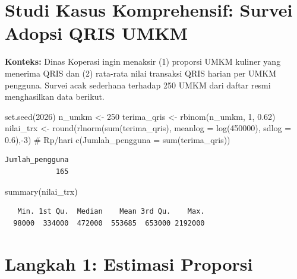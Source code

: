 \documentclass[
  indonesian,
  letterpaper,
]{book}
\newenvironment{Shaded}{\begin{snugshade}}{\end{snugshade}}
\newcommand{\AttributeTok}[1]{\textcolor[rgb]{0.40,0.45,0.13}{#1}}
\newcommand{\CommentTok}[1]{\textcolor[rgb]{0.37,0.37,0.37}{#1}}
\newcommand{\DecValTok}[1]{\textcolor[rgb]{0.68,0.00,0.00}{#1}}
\newcommand{\FloatTok}[1]{\textcolor[rgb]{0.68,0.00,0.00}{#1}}
\newcommand{\FunctionTok}[1]{\textcolor[rgb]{0.28,0.35,0.67}{#1}}
\newcommand{\NormalTok}[1]{\textcolor[rgb]{0.00,0.23,0.31}{#1}}
\newcommand{\OtherTok}[1]{\textcolor[rgb]{0.00,0.23,0.31}{#1}}
\newcommand{\SpecialCharTok}[1]{\textcolor[rgb]{0.37,0.37,0.37}{#1}}
\begin{document}
\section{Studi Kasus Komprehensif: Survei Adopsi QRIS
UMKM}\label{studi-kasus-komprehensif-survei-adopsi-qris-umkm}

\textbf{Konteks:} Dinas Koperasi ingin menaksir (1) proporsi UMKM
kuliner yang menerima QRIS dan (2) rata-rata nilai transaksi QRIS harian
per UMKM pengguna. Survei acak sederhana terhadap 250 UMKM dari daftar
resmi menghasilkan data berikut.

\begin{Shaded}
\begin{Highlighting}[]
\FunctionTok{set.seed}\NormalTok{(}\DecValTok{2026}\NormalTok{)}
\NormalTok{n\_umkm }\OtherTok{\textless{}{-}} \DecValTok{250}
\NormalTok{terima\_qris }\OtherTok{\textless{}{-}} \FunctionTok{rbinom}\NormalTok{(n\_umkm, }\DecValTok{1}\NormalTok{, }\FloatTok{0.62}\NormalTok{)}
\NormalTok{nilai\_trx }\OtherTok{\textless{}{-}} \FunctionTok{round}\NormalTok{(}\FunctionTok{rlnorm}\NormalTok{(}\FunctionTok{sum}\NormalTok{(terima\_qris), }\AttributeTok{meanlog =} \FunctionTok{log}\NormalTok{(}\DecValTok{450000}\NormalTok{), }\AttributeTok{sdlog =} \FloatTok{0.6}\NormalTok{),}\SpecialCharTok{{-}}\DecValTok{3}\NormalTok{) }\CommentTok{\# Rp/hari}
\FunctionTok{c}\NormalTok{(}\AttributeTok{Jumlah\_pengguna =} \FunctionTok{sum}\NormalTok{(terima\_qris))}
\end{Highlighting}
\end{Shaded}

\begin{verbatim}
Jumlah_pengguna 
            165 
\end{verbatim}

\begin{Shaded}
\begin{Highlighting}[]
\FunctionTok{summary}\NormalTok{(nilai\_trx)}
\end{Highlighting}
\end{Shaded}

\begin{verbatim}
   Min. 1st Qu.  Median    Mean 3rd Qu.    Max. 
  98000  334000  472000  553685  653000 2192000 
\end{verbatim}

\section{Langkah 1: Estimasi
Proporsi}\label{langkah-1-estimasi-proporsi}
\end{document}
